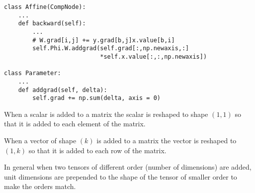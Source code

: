 {{\vfill
\eject
\vfill
\begin{verbatim}
class Affine(CompNode):
    ...
    def backward(self):
        ...
        # W.grad[i,j] += y.grad[b,j]x.value[b,i]
        self.Phi.W.addgrad(self.grad[:,np.newaxis,:]
                           *self.x.value[:,:,np.newaxis])

class Parameter:
    ...
    def addgrad(self, delta):
        self.grad += np.sum(delta, axis = 0)
\end{verbatim}


When a scalar is added to a matrix the scalar is reshaped to shape $(1,1)$ so that it is added to each element of the matrix.

\vfill
When a vector of shape $(k)$ is added to a matrix the vector is reshaped to $(1,k)$ so that it is added to each row of the matrix.

\vfill
In general when two tensors of different order (number of dimensions) are added, unit dimensions are prepended to the shape of the tensor of smaller order
to make the orders match.
}

}


